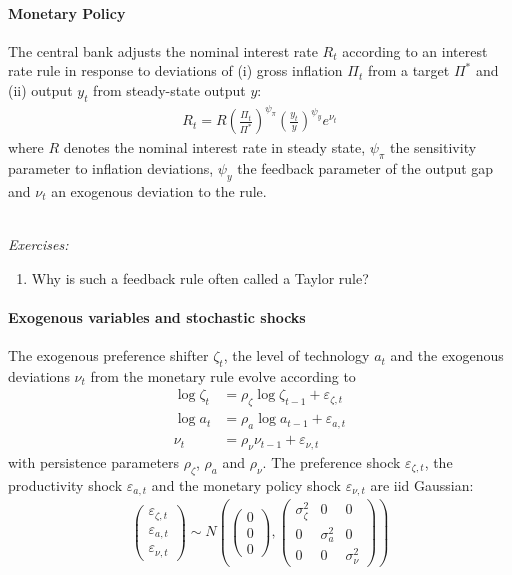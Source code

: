 \paragraph{Monetary Policy}
The central bank adjusts the nominal interest rate $R_t$ according to an interest rate rule
  in response to deviations of (i) gross inflation $\Pi_t$ from a target $\Pi^*$
  and (ii) output $y_t$ from steady-state output $y$:
\begin{align}
R_t = R \left(\frac{\Pi_t}{\Pi^*}\right)^{\psi_\pi} \left(\frac{y_t}{y}\right)^{\psi_y} e^{\nu_t} \label{eq:NewKeynesian.MonetaryPolicyRule}
\end{align}
where $R$ denotes the nominal interest rate in steady state,
  $\psi_\pi$ the sensitivity parameter to inflation deviations,
  $\psi_y$ the feedback parameter of the output gap
  and $\nu_t$ an exogenous deviation to the rule.

~\\\noindent\emph{Exercises:}
\begin{enumerate}[resume]
\item Why is such a feedback rule often called a Taylor rule?
\end{enumerate}

\paragraph{Exogenous variables and stochastic shocks}
The exogenous preference shifter $\zeta_t$, the level of technology $a_t$
  and the exogenous deviations $\nu_t$ from the monetary rule evolve according to
\begin{align}
\log{\zeta_t} &= \rho_\zeta \log{\zeta_{t-1}} + \varepsilon_{\zeta,t} \label{eq:NewKeynesian.LoM.PreferenceShifter}\\
\log{a_t} &= \rho_a \log{a_{t-1}} + \varepsilon_{a,t} \label{eq:NewKeynesian.LoM.TFP}\\
\nu_t &= \rho_\nu \nu_{t-1} + \varepsilon_{\nu,t} \label{eq:NewKeynesian.LoM.MonPol}
\end{align}
with persistence parameters $\rho_\zeta$, $\rho_a$ and $\rho_\nu$.
The preference shock $\varepsilon_{\zeta,t}$, the productivity shock $\varepsilon_{a,t}$
  and the monetary policy shock $\varepsilon_{\nu,t}$ are iid Gaussian:
\begin{align*}
\begin{pmatrix}
\varepsilon_{\zeta,t}\\\varepsilon_{a,t}\\\varepsilon_{\nu,t}
\end{pmatrix}
\sim N\left(\begin{pmatrix} 0\\0\\0\end{pmatrix}, \begin{pmatrix} \sigma_\zeta^2 & 0& 0\\0 & \sigma_{a}^2& 0\\0 & 0 & \sigma_{\nu}^2\end{pmatrix}\right)
\end{align*}

